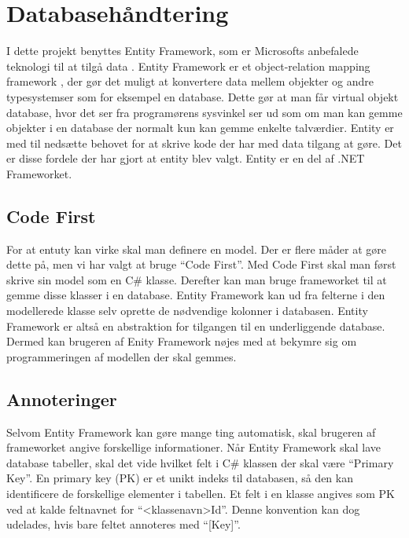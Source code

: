 \section{Databasehåndtering}
\label{sec:database}
I dette projekt benyttes Entity Framework, som er Microsofts anbefalede teknologi til at tilgå data \cite{entity}. Entity Framework er et object-relation mapping framework \cite{lerman2010programming}, der gør det muligt at konvertere data mellem objekter og andre typesystemser som for eksempel en database. Dette gør at man får virtual objekt database, hvor det ser fra programørens sysvinkel ser ud som om man kan gemme objekter i en database der normalt kun kan gemme enkelte talværdier. Entity er med til nedsætte behovet for at skrive kode der har med data tilgang at gøre. Det er disse fordele der har gjort at entity blev valgt. Entity er en del af .NET Frameworket.


\subsection{Code First}
\label{sub:code_first}
For at entuty kan virke skal man definere en model. Der er flere måder at gøre dette på, men vi har valgt at bruge \enquote{Code First}. Med Code First skal man først skrive sin model som en C\# klasse. Derefter kan man bruge frameworket til at gemme disse klasser i en database. Entity Framework kan ud fra felterne i den modellerede klasse selv oprette de nødvendige kolonner i databasen. Entity Framework er altså en abstraktion for tilgangen til en underliggende database. Dermed kan brugeren af Enity Framework nøjes med at bekymre sig om programmeringen af modellen der skal gemmes.

\subsection{Annoteringer}
\label{sub:annoteringer}
Selvom Entity Framework kan gøre mange ting automatisk, skal brugeren af frameworket angive forskellige informationer. Når Entity Framework skal lave database tabeller, skal det vide hvilket felt i C\# klassen der skal være \enquote{Primary Key}. En primary key (PK) er et unikt indeks til databasen, så den kan identificere de forskellige elementer i tabellen. Et felt i en klasse angives som PK ved at kalde feltnavnet for \enquote{<klassenavn>Id}. Denne konvention kan dog udelades, hvis bare feltet annoteres med \enquote{[Key]}.

